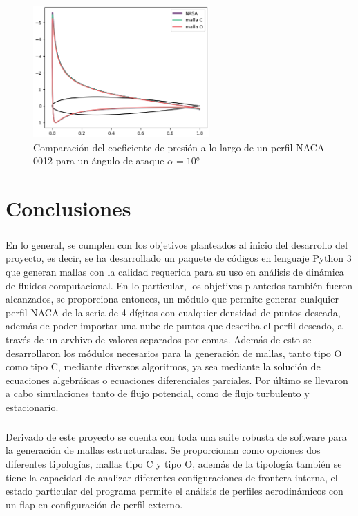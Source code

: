\documentclass[letterpaper, openright, 12pt]{book}
\begin{document}
    \begin{figure}
        \centering
        \includegraphics[keepaspectratio,
        width=0.6\textwidth]{./img/cp_comparison_10.png}
        \caption[Comparación del coeficiente de presión a $\alpha =
        10\si{\degree}$]{Comparación del coeficiente de presión a lo largo de
        un perfil NACA 0012 para un ángulo de ataque $\alpha = 10\si{\degree}$}
        \label{fig:cp_comparison_10}
    \end{figure}
%
%
%
%
%

%
%
%
%
%
\chapter{Conclusiones}
\paragraph*{}
    En lo general, se cumplen con los objetivos planteados al inicio del
    desarrollo del proyecto, es decir, se ha desarrollado un paquete de códigos
    en lenguaje Python 3 que generan mallas con la calidad requerida para su
    uso en análisis de dinámica de fluidos computacional. En lo particular, los
    objetivos plantedos también fueron alcanzados, se proporciona entonces, un
    módulo que permite generar cualquier perfil NACA de la seria de 4 dígitos
    con cualquier densidad de puntos deseada, además de poder importar una nube
    de puntos que describa el perfil deseado, a través de un arvhivo de valores
    separados por comas. Además de esto se desarrollaron los módulos necesarios
    para la generación de mallas, tanto tipo O como tipo C, mediante diversos
    algoritmos, ya sea mediante la solución de ecuaciones algebráicas o
    ecuaciones diferenciales parciales. Por último se llevaron a cabo
    simulaciones tanto de flujo potencial, como de flujo turbulento y
    estacionario.

\paragraph*{}
    Derivado de este proyecto se cuenta con toda una suite robusta de software
    para la generación de mallas estructuradas. Se proporcionan como opciones
    dos diferentes tipologías, mallas tipo C y tipo O, además de la tipología
    también se tiene la capacidad de analizar diferentes configuraciones de
    frontera interna, el estado particular del programa permite el análisis de
    perfiles aerodinámicos con un flap en configuración de perfil externo.
\end{document}
